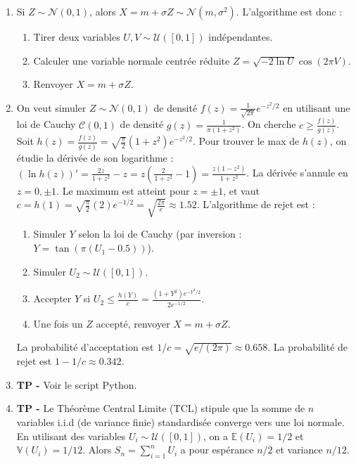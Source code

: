 \documentclass[solutions]{exercices}
\begin{document}
\begin{solution}
\begin{enumerate}
    \item Si $Z \sim \mathcal{N}(0,1)$, alors $X=m+\sigma Z \sim \mathcal{N}(m, \sigma^2)$. L'algorithme est donc :
    \begin{enumerate}
        \item Tirer deux variables $U, V \sim \mathcal{U}([0,1])$ indépendantes.
        \item Calculer une variable normale centrée réduite $Z = \sqrt{-2\ln U}\cos(2\pi V)$.
        \item Renvoyer $X=m+\sigma Z$.
    \end{enumerate}
    \item On veut simuler $Z \sim \mathcal{N}(0,1)$ de densité $f(z) = \frac{1}{\sqrt{2\pi}}e^{-z^2/2}$ en utilisant une loi de Cauchy $\mathcal{C}(0,1)$ de densité $g(z)=\frac{1}{\pi(1+z^2)}$.
    On cherche $c \ge \frac{f(z)}{g(z)}$. Soit $h(z) = \frac{f(z)}{g(z)} = \sqrt{\frac{\pi}{2}}(1+z^2)e^{-z^2/2}$.
    Pour trouver le max de $h(z)$, on étudie la dérivée de son logarithme : $(\ln h(z))' = \frac{2z}{1+z^2} - z = z(\frac{2}{1+z^2}-1) = \frac{z(1-z^2)}{1+z^2}$. La dérivée s'annule en $z=0, \pm 1$. Le maximum est atteint pour $z=\pm 1$, et vaut $c = h(1) = \sqrt{\frac{\pi}{2}}(2)e^{-1/2} = \sqrt{\frac{2\pi}{e}} \approx 1.52$.
    L'algorithme de rejet est :
    \begin{enumerate}
        \item Simuler $Y$ selon la loi de Cauchy (par inversion : $Y=\tan(\pi(U_1-0.5))$).
        \item Simuler $U_2 \sim \mathcal{U}([0,1])$.
        \item Accepter $Y$ si $U_2 \le \frac{h(Y)}{c} = \frac{(1+Y^2)e^{-Y^2/2}}{2e^{-1/2}}$.
        \item Une fois un $Z$ accepté, renvoyer $X=m+\sigma Z$.
    \end{enumerate}
    La probabilité d'acceptation est $1/c = \sqrt{e/(2\pi)} \approx 0.658$. La probabilité de rejet est $1-1/c \approx 0.342$.
    \item \textbf{TP -} Voir le script Python.
    \item \textbf{TP -} Le Théorème Central Limite (TCL) stipule que la somme de $n$ variables i.i.d (de variance finie) standardisée converge vers une loi normale. En utilisant des variables $U_i \sim \mathcal{U}([0,1])$, on a $\mathbb{E}(U_i)=1/2$ et $\mathbb{V}(U_i)=1/12$.
    Alors $S_n = \sum_{i=1}^n U_i$ a pour espérance $n/2$ et variance $n/12$.

\end{enumerate}
\end{solution}
\end{document}
